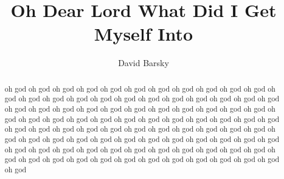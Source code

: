 \documentclass[11pt, oneside]{article}   	%
\title{Oh Dear Lord What Did I Get Myself Into}
\author{David Barsky}
\date{}
\begin{document}
\maketitle

\begin{abstract}
oh god oh god oh god oh god oh god oh god oh god oh god oh god oh god oh god oh god oh god oh god oh god oh god oh god oh god oh god oh god oh god oh god oh god oh god oh god oh god oh god oh god oh god oh god oh god oh god oh god oh god oh god oh god oh god oh god oh god oh god oh god oh god oh god oh god oh god oh god oh god oh god oh god oh god oh god oh god oh god oh god oh god oh god oh god oh god oh god oh god oh god oh god oh god oh god oh god oh god oh god oh god oh god oh god oh god oh god oh god oh god oh god oh god oh god oh god oh god oh god oh god oh god oh god oh god oh god oh god oh god oh god oh god oh god oh god oh god oh god 
\end{abstract}

\end{document}
